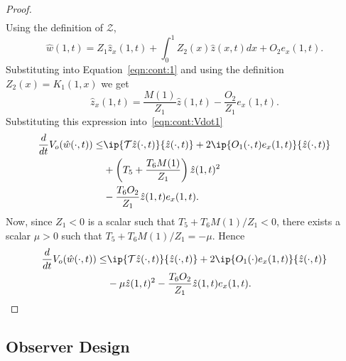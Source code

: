 \documentclass[US letter, 9 pt, conference]{ieeeconf}  \usepackage{setspace}
\newcommand{\igzo}{\int_0^1}
\newcommand{\wh}{\hat{w}}
\newcommand{\mcl}[1]{\mathcal{#1}}
\newcommand{\zh}{\hat{z}}
\begin{document}
\begin{proof}
\begin{align*}
\end{align*} Using the definition of $\mcl{Z}$,
\[\wh(1,t)=Z_1 \zh_x(1,t)+\igzo Z_2(x)\zh(x,t)dx+O_2 e_x(1,t).\] Substituting into Equation~\eqref{eqn:cont:1} and using the definition $Z_2(x)=K_1(1,x)$ we get
\[\zh_x(1,t)=\frac{M(1)}{Z_1}\zh(1,t)-\frac{O_2}{Z_1}e_x(1,t).\] Substituting this expression into~\eqref{eqn:cont:Vdot1}
\begin{align*}
\frac{d}{dt}V_o(\wh(\cdot,t)) \leq & \ip{\mcl{T}\zh(\cdot,t)}{\zh(\cdot,t)}+2 \ip{O_1(\cdot,t)e_x(1,t)}{\zh(\cdot,t)} \\
&+\left(T_5+\frac{T_6 M(1)}{Z_1} \right)\zh(1,t)^2\\
& -\frac{T_6 O_2}{Z_1}\zh(1,t)e_x(1,t).
\end{align*} Now, since $Z_1<0$ is a scalar such that $T_5+T_6M(1)/Z_1<0$, there exists a scalar $\mu>0$ such that $T_5+T_6 M(1) /Z_1=-\mu$. Hence
\begin{align*}
\frac{d}{dt}V_o(\wh(\cdot,t)) \leq & \ip{\mcl{T}\zh(\cdot,t)}{\zh(\cdot,t)}+2 \ip{O_1(\cdot)e_x(1,t)}{\zh(\cdot,t)} \\
& -\mu \zh(1,t)^2 -\frac{T_6 O_2}{Z_1}\zh(1,t)e_x(1,t).
\end{align*}
\end{proof}
\subsection{Observer Design}
\end{document}
